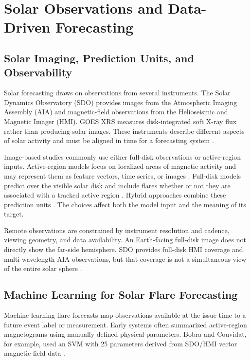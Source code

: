 \documentclass[12pt]{report}
\begin{document}
\section{Solar Observations and Data-Driven Forecasting}

\subsection{Solar Imaging, Prediction Units, and Observability}

Solar forecasting draws on observations from several instruments. The Solar Dynamics Observatory (SDO) provides images from the Atmospheric Imaging Assembly (AIA) and magnetic-field observations from the Helioseismic and Magnetic Imager (HMI). GOES XRS measures disk-integrated soft X-ray flux rather than producing solar images. These instruments describe different aspects of solar activity and must be aligned in time for a forecasting system \citep{nasa_sdo_instruments}.

Image-based studies commonly use either full-disk observations or active-region inputs. Active-region models focus on localized areas of magnetic activity and may represent them as feature vectors, time series, or images \citep{ahmadzadeh2019challenges,ji2022solar,abed2021automated}. Full-disk models predict over the visible solar disk and include flares whether or not they are associated with a tracked active region \citep{pandey2021solar}. Hybrid approaches combine these prediction units \citep{pandey2022towards}. The choices affect both the model input and the meaning of its target.

Remote observations are constrained by instrument resolution and cadence, viewing geometry, and data availability. An Earth-facing full-disk image does not directly show the far-side hemisphere. SDO provides full-disk HMI coverage and multi-wavelength AIA observations, but that coverage is not a simultaneous view of the entire solar sphere \citep{nasa_sdo_instruments,nasa_sun_farside}.

\subsection{Machine Learning for Solar Flare Forecasting}

Machine-learning flare forecasts map observations available at the issue time to a future event label or measurement. Early systems often summarized active-region magnetograms using manually defined physical parameters. Bobra and Couvidat, for example, used an SVM with 25 parameters derived from SDO/HMI vector magnetic-field data \citep{bobra2015solarflare}.
\end{document}
